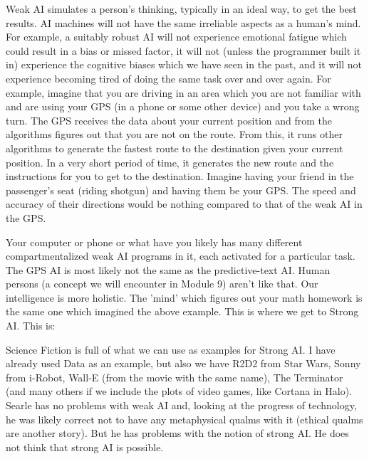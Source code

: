 Weak AI simulates a person's thinking, typically in an ideal way, to get the best results. AI machines will not have the same irreliable aspects as a human's mind. For example, a suitably robust AI will not experience emotional fatigue which could result in a bias or missed factor, it will not (unless the programmer built it in) experience the cognitive biases which we have seen in the past, and it will not experience becoming tired of doing the same task over and over again. For example, imagine that you are driving in an area which you are not familiar with and are using your GPS (in a phone or some other device) and you take a wrong turn. The GPS receives the data about your current position and from the algorithms figures out that you are not on the route. From this, it runs other algorithms to generate the fastest route to the destination given your current position. In a very short period of time, it generates the new route and the instructions for you to get to the destination. Imagine having your friend in the passenger's seat (riding shotgun) and having them be your GPS. The speed and accuracy of their directions would be nothing compared to that of the weak AI in the GPS.

Your computer or phone or what have you likely has many different compartmentalized weak AI programs in it, each activated for a particular task. The GPS AI is most likely not the same as the predictive-text AI. Human persons (a concept we will encounter in Module 9) aren't like that. Our intelligence is more holistic. The 'mind' which figures out your math homework is the same one which imagined the above example. This is where we get to Strong AI. This is:


Science Fiction is full of what we can use as examples for Strong AI. I have already used Data as an example, but also we have R2D2 from Star Wars, Sonny from i-Robot, Wall-E (from the movie with the same name),  The Terminator (and many others if we include the plots of video games, like Cortana in Halo).  Searle has no problems with weak AI and, looking at the progress of technology, he was likely correct not to have any metaphysical qualms with it (ethical qualms are another story).  But he has problems with the notion of strong AI. He does not think that strong AI is possible.

